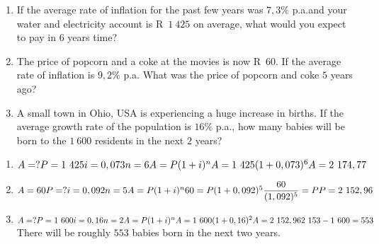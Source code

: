 \begin{exercises}{}{
    \begin{enumerate}[label=\textbf{\arabic*}.]
	\item If the average rate of inflation for the past few years was $7,3\%$ p.a.\@ and your water and electricity account is R~$1~425$ on average, what would you expect to pay in $6$ years time?
	\item The price of popcorn and a coke at the movies is now R~$60$. If the average rate of inflation is $9,2\%$ p.a. What was the price of popcorn and coke $5$ years ago?
	\item A small town in Ohio, USA is experiencing a huge increase in births. If the average growth rate of the population is $16\%$ p.a., how many babies will be born to the $1~600$ residents in the next $2$ years?\\
    \end{enumerate}
}
\end{exercises}


 \begin{solutions}{}{
\begin{enumerate}[itemsep=5pt, label=\textbf{\arabic*}. ] 


\item $A = ?\\
P=1~425\\
i=0,073\\
n=6\\
A=P(1 + i)^{n}\\
A = 1~425(1 + 0,073)^{6}\\
A = 2~174,77$
\item $A = 60\\
P=?\\
i=0,092\\
n=5\\
A=P(1 + i)^{n}\\
60 = P(1 + 0,092)^{5}\\
\dfrac{60}{(1,092)^5}=P\\
P = 2~152,96$
\item $A = ?\\
P=1~600\\
i=0,16\\
n=2\\
A=P(1 + i)^{n}\\
A = 1~600(1 + 0,16)^{2}\\
A = 2~152,96\\
2~153-1~600=553$\\
There will be roughly $553$ babies born in the next two years.
\end{enumerate}}
\end{solutions}


